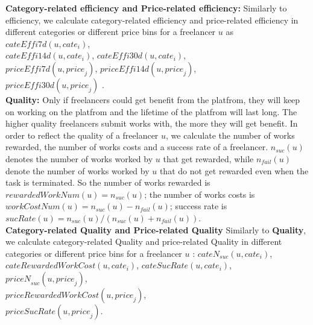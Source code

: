 \textbf{ Category-related efficiency and Price-related efficiency:} Similarly to efficiency,  we calculate category-related efficiency and price-related efficiency in different categories or different price bins for a freelancer $u$ as $cateEffi7d(u, {cate}_{i})$, \\$cateEffi14d(u, {cate}_{i})$, $cateEffi30d(u, {cate}_{i})$, \\$priceEffi7d(u, {price}_{j})$, $priceEffi14d(u, {price}_{j})$, \\$priceEffi30d(u, {price}_{j})$ .\\
%
\textbf{Quality:} Only if freelancers could get benefit from the platfrom, they will keep on working on the platfrom and the lifetime of the platfrom will last long. The higher quality freelancers submit works with, the more they will get benefit. In order to reflect the quality of a freelancer $u$, we calculate the number of works rewarded, the number of works costs and a success rate of a freelancer. ${n}_{suc}(u)$ denotes the number of works worked by $u$ that get rewarded, while ${n}_{fail}(u)$ denote the number of works worked by $u$ that do not get rewarded even when the task is terminated. So the number of works rewarded is $rewardedWorkNum(u)={n}_{suc}(u)$; the number of works costs is $workCostNum(u)={n}_{suc}(u) - {n}_{fail}(u)$; success rate is $sucRate(u)={n}_{suc}(u)/({n}_{suc}(u) + {n}_{fail}(u))$. \\
\textbf{ Category-related Quality and Price-related Quality} Similarly to \textbf{Quality},  we calculate category-related Quality and price-related Quality in different categories or different price bins for a freelancer $u$ : ${cateN}_{suc}(u, {cate}_{i})$, \\$cateRewardedWorkCost(u, {cate}_{i})$, $cateSucRate(u, {cate}_{i})$, \\${priceN}_{suc}(u, {price}_{j})$, \\$priceRewardedWorkCost(u, {price}_{j})$, \\$priceSucRate(u, {price}_{j})$. 

